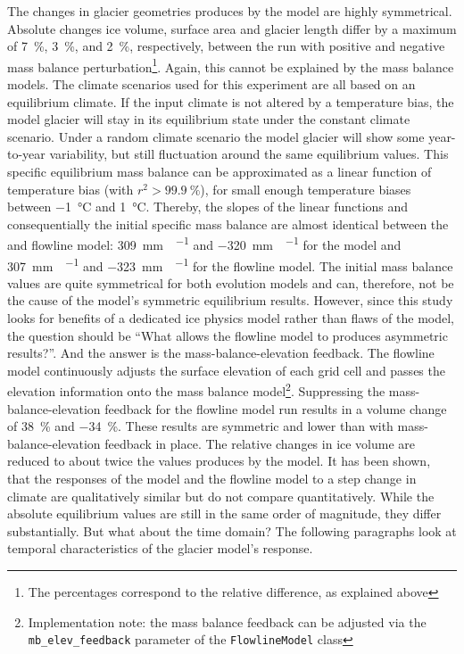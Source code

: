     The changes in glacier geometries produces by the \vas{} model are highly symmetrical. Absolute changes ice volume, surface area and glacier length differ by a maximum of \SI{7}{\percent}, \SI{3}{\percent}, and \SI{2}{\percent}, respectively, between the run with positive and negative mass balance perturbation\footnote{The percentages correspond to the relative difference, as explained above}.
    Again, this cannot be explained by the mass balance models. The climate scenarios used for this experiment are all based on an equilibrium climate. If the input climate is not altered by a temperature bias, the model glacier will stay in its equilibrium state under the constant climate scenario. Under a random climate scenario the model glacier will show some year-to-year variability, but still fluctuation around the same equilibrium values. This specific equilibrium mass balance can be approximated as a linear function of temperature bias (with $r^2 > \SI{99.9}{\percent}$), for small enough temperature biases between \SI{-1}{\celsius} and \SI{+1}{\celsius}. Thereby, the slopes of the linear functions and consequentially the initial specific mass balance are almost identical between the \vas{} and flowline model: \SI{+309}{\milli\meter\waterequivalent\per\year} and \SI{-320}{\milli\meter\waterequivalent\per\year} for the \vas{} model and \SI{+307}{\milli\meter\waterequivalent\per\year} and \SI{-323}{\milli\meter\waterequivalent\per\year} for the flowline model. The initial mass balance values are quite symmetrical for both evolution models and can, therefore, not be the cause of the \vas{} model's symmetric equilibrium results.
    However, since this study looks for benefits of a dedicated ice physics model rather than flaws of the \vas{} model, the question should be “What allows the flowline model to produces asymmetric results?”. %
    And the answer is the mass-balance-elevation feedback. The flowline model continuously adjusts the surface elevation of each grid cell and passes the elevation information onto the mass balance model\footnote{Implementation note: the mass balance feedback can be adjusted via the \lstinline`mb_elev_feedback` parameter of the \lstinline`FlowlineModel` class}. Suppressing the mass-balance-elevation feedback for the flowline model run results in a volume change of \SI{+38}{\percent} and \SI{-34}{\percent}. These results are symmetric and lower than with mass-balance-elevation feedback in place. The relative changes in ice volume are reduced to about twice the values produces by the \vas{} model.
    It has been shown, that the responses of the \vas{} model and the flowline model to a step change in climate are qualitatively similar but do not compare quantitatively. While the absolute equilibrium values are still in the same order of magnitude, they differ substantially. But what about the time domain? The following paragraphs look at temporal characteristics of the glacier model's response.

